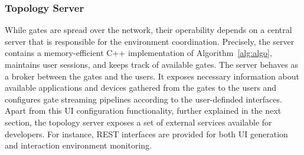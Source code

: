 \documentclass[twoside,twocolumn,10pt]{article}
\begin{document}
%
%




\subsubsection{Topology Server}

While gates are spread over the network, their operability depends on a central server that is responsible for the environment coordination.
Precisely, the server contains a memory-efficient C++ implementation of Algorithm~\ref{alg:algo}, maintains user sessions, and keeps track of available gates.
The server behaves as a broker between the gates and the users. It exposes necessary information about available applications and devices gathered from the gates to the users and configures gate streaming pipelines according to the user-definded interfaces. Apart from this UI configuration functionality, further explained in the next section, the topology server exposes a set of external services available for developers.
For instance, REST interfaces are provided for both UI generation and interaction environment monitoring.
\end{document}
